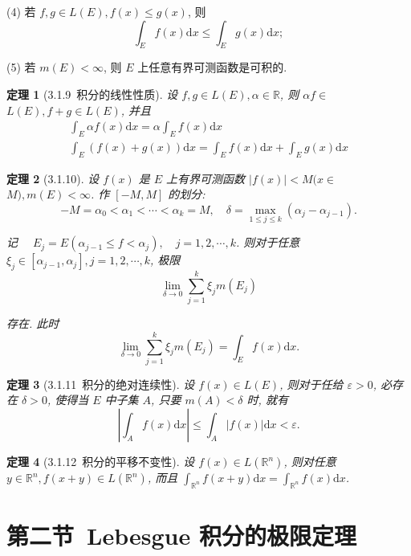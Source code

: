 \documentclass[10pt,openany]{book}
\theoremstyle{thmstyle} %
\newtheorem{theorem}{定理}[chapter]
\theoremstyle{defstyle} %
\theoremstyle{prostyle} %
\begin{document}
(4) 若 $f, g \in L(E), f(x) \leq g(x)$, 则
$$
\int_E f(x) \mathrm{d} x \leq \int_E g(x) \mathrm{d} x ;
$$

(5) 若 $m(E)<\infty$, 则 $E$ 上任意有界可测函数是可积的.



\begin{theorem}[3.1.9~积分的线性性质]
设 $f, g \in L(E), \alpha \in \mathbb{R}$, 则 $\alpha f \in$ $L(E), f+g \in L(E)$, 并且
$$
\begin{gathered}
\int_E \alpha f(x) \mathrm{d} x=\alpha \int_E f(x) \mathrm{d} x \\
\int_E(f(x)+g(x)) \mathrm{d} x=\int_E f(x) \mathrm{d} x+\int_E g(x) \mathrm{d} x
\end{gathered}
$$
\end{theorem}

\begin{theorem}[3.1.10]
设 $f(x)$ 是 $E$ 上有界可测函数 $|f(x)|<M(x \in$ $M), m(E)<\infty$. 作 $[-M, M]$ 的划分:
$$
-M=\alpha_0<\alpha_1<\cdots<\alpha_k=M, \quad \delta=\max _{1 \leq j \leq k}\left(\alpha_j-\alpha_{j-1}\right) .
$$

记 $\quad E_j=E\left(\alpha_{j-1} \leq f<\alpha_j\right), \quad j=1,2, \cdots, k$.
则对于任意 $\xi_j \in\left[\alpha_{j-1}, \alpha_j\right], j=1,2, \cdots, k$, 极限
$$
\lim _{\delta \rightarrow 0} \sum_{j=1}^k \xi_j m\left(E_j\right)
$$

存在. 此时
$$
\lim _{\delta \rightarrow 0} \sum_{j=1}^k \xi_j m\left(E_j\right)=\int_E f(x) \mathrm{d} x .
$$
\end{theorem}

\begin{theorem}[3.1.11~积分的绝对连续性]
设 $f(x) \in L(E)$, 则对于任给 $\varepsilon>0$, 必存在 $\delta>0$, 使得当 $E$ 中子集 $A$, 只要 $m(A)<\delta$ 时, 就有
$$
\left|\int_A f(x) \mathrm{d} x\right| \leq \int_A|f(x)| \mathrm{d} x<\varepsilon .
$$
\end{theorem}


\begin{theorem}[3.1.12~积分的平移不变性]
设 $f(x) \in L\left(\mathbb{R}^n\right)$, 则对任意 $y \in \mathbb{R}^n, f(x+y) \in L\left(\mathbb{R}^n\right)$, 而且
$\int_{\mathbb{R}^n} f(x+y) \mathrm{d} x=\int_{\mathbb{R}^n} f(x) \mathrm{d} x$.
\end{theorem}








\section{第二节~Lebesgue 积分的极限定理}
\end{document}
